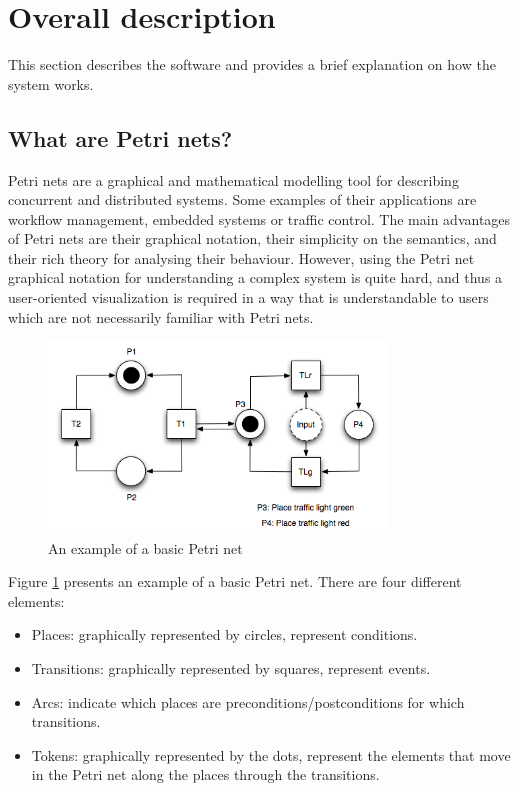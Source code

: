 \section{Overall description}

This section describes the software and provides a brief explanation on how the system works.

\subsection{What are Petri nets?}

Petri nets are a graphical and mathematical modelling tool for describing concurrent and distributed systems. Some examples of their applications are workflow management, embedded systems or traffic control. The main advantages of Petri nets are their graphical notation, their simplicity on the semantics, and their rich theory for analysing their behaviour. However, using the Petri net graphical notation for understanding a complex system is quite hard, and thus a user-oriented visualization is required in a way that is understandable to users which are not necessarily familiar with Petri nets.


\begin{figure}[htp]
\begin{center}
  \includegraphics[width=0.8\textwidth]{image/petrinet_diagram_2.png}
  \caption{An example of a basic Petri net}
  \label{fig:petrinet}
\end{center}
\end{figure}

Figure \ref{fig:petrinet} presents an example of a basic Petri net. There are four different elements:

\begin{itemize}
\item Places: graphically represented by circles, represent conditions.
\item Transitions: graphically represented by squares, represent events.
\item Arcs: indicate which places are preconditions/postconditions for which transitions.
\item Tokens: graphically represented by the dots, represent the elements that move in the Petri net along the places through the transitions.
\end{itemize}


